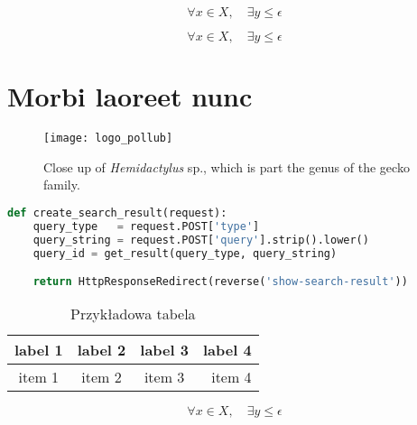 \lipsum[6]

\begin{equation}
 \forall x \in X, \quad \exists y \leq \epsilon
\end{equation}

\lipsum[7]

\begin{equation}
 \forall x \in X, \quad \exists y \leq \epsilon
\end{equation}

\lipsum[8]

\section{Morbi laoreet nunc}

\lipsum[9]

\begin{figure}[ht]
  \centering
  \texttt{[image: logo\_pollub]}
  \caption[Close up of \textit{Hemidactylus} sp.]%
  {Close up of \textit{Hemidactylus} sp., which is
  part the genus of the gecko family.}
\end{figure}

\lipsum[10]

\begin{lstlisting}[language=Python,caption={Przykładowy listing},label=lst:somelabel]
def create_search_result(request):
    query_type   = request.POST['type']
    query_string = request.POST['query'].strip().lower()
    query_id = get_result(query_type, query_string)

    return HttpResponseRedirect(reverse('show-search-result'))
\end{lstlisting}

\lipsum[11]

\begin{table}[h]
  \center
  \caption{Przykładowa tabela}
  \label{my_table}
  \begin{tabular}{ | c | c | c | r | }
    \hline
  label 1 & label 2 & label 3 & label 4 \\
  \hline
  item 1  & item 2  & item 3  & item 4  \\
  \hline
  \end{tabular}
\end{table}

\lipsum[12]

\begin{equation}
 \forall x \in X, \quad \exists y \leq \epsilon
\end{equation}

\lipsum[13]

